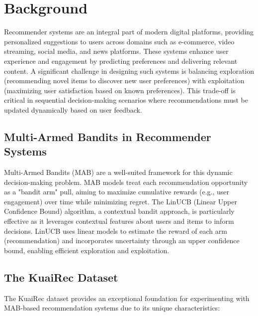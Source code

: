 \section{Background}

Recommender systems are an integral part of modern digital platforms, providing personalized suggestions to users across domains such as e-commerce, video streaming, social media, and news platforms. These systems enhance user experience and engagement by predicting preferences and delivering relevant content. A significant challenge in designing such systems is balancing exploration (recommending novel items to discover new user preferences) with exploitation (maximizing user satisfaction based on known preferences). This trade-off is critical in sequential decision-making scenarios where recommendations must be updated dynamically based on user feedback.

\subsection{Multi-Armed Bandits in Recommender Systems}
Multi-Armed Bandits (MAB) are a well-suited framework for this dynamic decision-making problem. MAB models treat each recommendation opportunity as a "bandit arm" pull, aiming to maximize cumulative rewards (e.g., user engagement) over time while minimizing regret. The LinUCB (Linear Upper Confidence Bound) algorithm, a contextual bandit approach, is particularly effective as it leverages contextual features about users and items to inform decisions. LinUCB uses linear models to estimate the reward of each arm (recommendation) and incorporates uncertainty through an upper confidence bound, enabling efficient exploration and exploitation.

\subsection{The KuaiRec Dataset}

The KuaiRec dataset provides an exceptional foundation for experimenting with MAB-based recommendation systems due to its unique characteristics:

